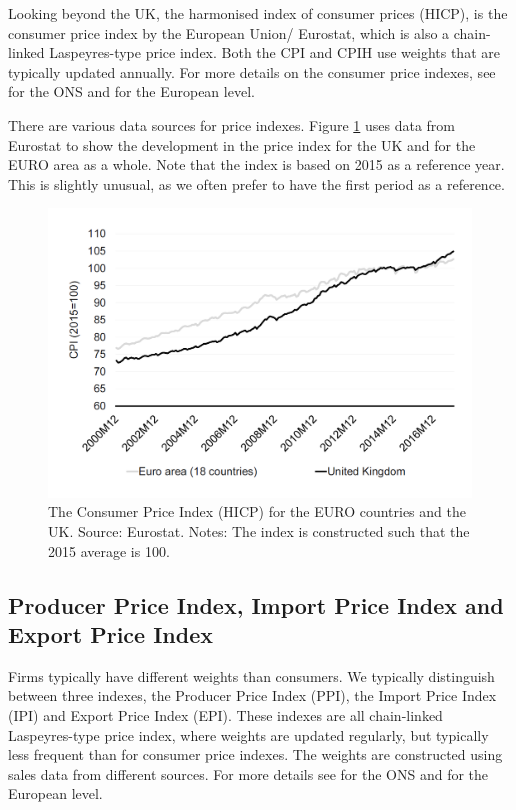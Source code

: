 \documentclass[]{book}
\begin{document}
Looking beyond the UK, the harmonised index of consumer prices (HICP), is the consumer price index by the European Union/ Eurostat, which is also a chain-linked Laspeyres-type price index. Both the CPI and CPIH use weights that are typically updated annually. For more details on the consumer price indexes, see \citep{cpions} for the ONS and \citep{cpieu} for the European level.

There are various data sources for price indexes. Figure \ref{fig:pricefig1} uses data from Eurostat to show the development in the price index for the UK and for the EURO area as a whole. Note that the index is based on 2015 as a reference year. This is slightly unusual, as we often prefer to have the first period as a reference.

\begin{figure}

{\centering \includegraphics[width=0.75\linewidth]{_resources/chapter_prices/ex1_1} 

}

\caption{The Consumer Price Index (HICP) for the EURO countries and the UK. Source: Eurostat. Notes: The index is constructed such that the 2015 average is 100.}\label{fig:pricefig1}
\end{figure}

\hypertarget{producer-price-index-import-price-index-and-export-price-index}{%
\subsection{Producer Price Index, Import Price Index and Export Price Index}\label{producer-price-index-import-price-index-and-export-price-index}}

Firms typically have different weights than consumers. We typically distinguish between three indexes, the Producer Price Index (PPI), the Import Price Index (IPI) and Export Price Index (EPI). These indexes are all chain-linked Laspeyres-type price index, where weights are updated regularly, but typically less frequent than for consumer price indexes. The weights are constructed using sales data from different sources. For more details see \citep{ppions} for the ONS and \citep{ppieu} for the European level.
\end{document}
